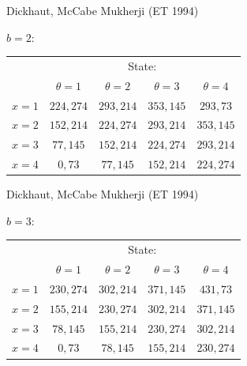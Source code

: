\documentclass{beamer}
\begin{document}
\begin{frame}{Dickhaut, McCabe Mukherji (ET 1994)}
\begin{card}[Treatment]
$b=2$:
\begin{center}
	\begin{tabular}{r|c|c|c|c|} 
			\multicolumn{1}{r}{ }& \multicolumn{4}{c}{State:}		\\
			\multicolumn{1}{r}{ }& \multicolumn{1}{c}{$\theta=1$}  & \multicolumn{1}{c}{$\theta=2$} & \multicolumn{1}{c}{$\theta=3$}& \multicolumn{1}{c}{$\theta=4$} \\ \cline{2-5}
			$x=1$ &  $224,274$ & $293,214$  & $353,145$ & $293,73$  \\ \cline{2-5}
			$x=2$ &  $152,214$ & $224,274$  & $293,214$ & $353,145$ \\ \cline{2-5}
			$x=3$ &  $77,145$  & $152,214$  & $224,274$ & $293,214$  \\ \cline{2-5}
			$x=4$ &  $0,73$    & $77,145$   & $152,214$ & $224,274$    \\ \cline{2-5}
		\end{tabular}
	\end{center}
\end{card}
\end{frame}

\begin{frame}{Dickhaut, McCabe Mukherji (ET 1994)}
    \begin{card}[Treatment]
$b=3$:
    \begin{center}
    	\begin{tabular}{r|c|c|c|c|} 
    			\multicolumn{1}{r}{ }& \multicolumn{4}{c}{State:}		\\
    			\multicolumn{1}{r}{ }& \multicolumn{1}{c}{$\theta=1$}  & \multicolumn{1}{c}{$\theta=2$} & \multicolumn{1}{c}{$\theta=3$}& \multicolumn{1}{c}{$\theta=4$} \\ \cline{2-5}
    			$x=1$ &  $230,274$ & $302,214$  & $371,145$ & $431,73$  \\ \cline{2-5}
    			$x=2$ &  $155,214$ & $230,274$  & $302,214$ & $371,145$ \\ \cline{2-5}
    			$x=3$ &  $78,145$  & $155,214$  & $230,274$ & $302,214$  \\ \cline{2-5}
    			$x=4$ &  $0,73$    & $78,145$   & $155,214$  & $230,274$    \\ \cline{2-5}
    		\end{tabular}
    	\end{center}
    \end{card}
\end{frame}
\end{document}
